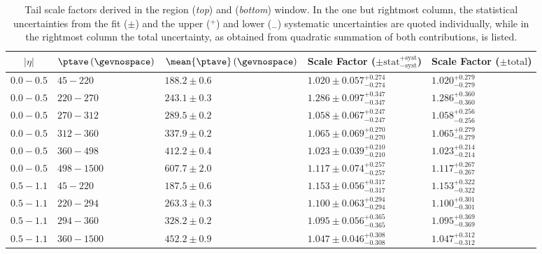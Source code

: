 \begin{table}[!htb]
  \caption{
    Tail scale factors derived in the region  (\textit{top}) and  (\textit{bottom}) window.
    In the one but rightmost column, the statistical uncertainties from the fit ($\pm$) and the upper (${}^{+}$) and lower (${}_{-}$) systematic uncertainties are quoted individually, while in the rightmost column the total uncertainty, as obtained from quadratic summation of both contributions, is listed.
}
  \label{tab:App:ResTails:ScaleFactorsIncl}
  \begin{center}
    \begin{tabular}{cllll}
      \toprule
      $|\eta|$ & $\ptave\,(\gevnospace)$ & $\mean{\ptave}\,(\gevnospace)$ & Scale Factor ($\pm\text{stat}{}^{+\text{syst}}_{-\text{syst}}$) & Scale Factor ($\pm\text{total}$) \\
      \midrule
      $0.0 - 0.5$ & $45 - 220$ & $188.2 \pm 0.6$ & $1.020 \pm 0.057^{+0.274}_{-0.274}$ & $1.020^{+0.279}_{-0.279} $ \\
      $0.0 - 0.5$ & $220 - 270$ & $243.1 \pm 0.3$ & $1.286 \pm 0.097^{+0.347}_{-0.347}$ & $1.286^{+0.360}_{-0.360} $ \\
      $0.0 - 0.5$ & $270 - 312$ & $289.5 \pm 0.2$ & $1.058 \pm 0.067^{+0.247}_{-0.247}$ & $1.058^{+0.256}_{-0.256} $ \\
      $0.0 - 0.5$ & $312 - 360$ & $337.9 \pm 0.2$ & $1.065 \pm 0.069^{+0.270}_{-0.270}$ & $1.065^{+0.279}_{-0.279} $ \\
      $0.0 - 0.5$ & $360 - 498$ & $412.2 \pm 0.4$ & $1.023 \pm 0.039^{+0.210}_{-0.210}$ & $1.023^{+0.214}_{-0.214} $ \\
      $0.0 - 0.5$ & $498 - 1500$ & $607.7 \pm 2.0$ & $1.117 \pm 0.074^{+0.257}_{-0.257}$ & $1.117^{+0.267}_{-0.267} $ \\
      \midrule
      $0.5 - 1.1$ & $45 - 220$ & $187.5 \pm 0.6$ & $1.153 \pm 0.056^{+0.317}_{-0.317}$ & $1.153^{+0.322}_{-0.322} $ \\
      $0.5 - 1.1$ & $220 - 294$ & $263.3 \pm 0.3$ & $1.100 \pm 0.063^{+0.294}_{-0.294}$ & $1.100^{+0.301}_{-0.301} $ \\
      $0.5 - 1.1$ & $294 - 360$ & $328.2 \pm 0.2$ & $1.095 \pm 0.056^{+0.365}_{-0.365}$ & $1.095^{+0.369}_{-0.369} $ \\
      $0.5 - 1.1$ & $360 - 1500$ & $452.2 \pm 0.9$ & $1.047 \pm 0.046^{+0.308}_{-0.308}$ & $1.047^{+0.312}_{-0.312} $ \\
      \midrule

\end{tabular}
\end{center}
\end{table}
